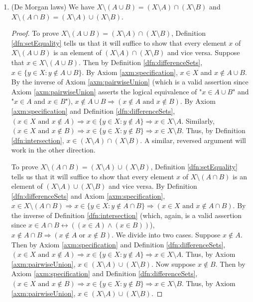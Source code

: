 \documentclass[../main.tex]{subfiles}
\begin{document}
\begin{enumerate}[ref={\thesection.\arabic*}]
\begin{prp}
\begin{enumerate}[label={\textup{(}\alph*\textup{)}}]
\begin{proof}
            \end{proof}
            \item (De Morgan laws) We have $X\setminus(A\cup B)=(X\setminus A)\cap(X\setminus B)$ and $X\setminus(A\cap B)=(X\setminus A)\cup(X\setminus B)$.
            \begin{proof}
                To prove $X\setminus(A\cup B)=(X\setminus A)\cap(X\setminus B)$, Definition \ref{dfn:setEquality} tells us that it will suffice to show that every element $x$ of $X\setminus(A\cup B)$ is an element of $(X\setminus A)\cap(X\setminus B)$ and vice versa. Suppose that $x\in X\setminus(A\cup B)$. Then by Definition \ref{dfn:differenceSets}, $x\in\{y\in X:y\notin A\cup B\}$. By Axiom \ref{axm:specification}, $x\in X$ and $x\notin A\cup B$. By the inverse of Axiom \ref{axm:pairwiseUnion} (which is a valid assertion since Axiom \ref{axm:pairwiseUnion} asserts the logical equivalence of "$x\in A\cup B$" and "$x\in A$ and $x\in B$"), $x\notin A\cup B \Longrightarrow (x\notin A\text{ and }x\notin B)$. By Axiom \ref{axm:specification} and Definition \ref{dfn:differenceSets}, $(x\in X\text{ and }x\notin A) \Longrightarrow x\in\{y\in X:y\notin A\} \Longrightarrow x\in X\setminus A$. Similarly, $(x\in X\text{ and }x\notin B) \Longrightarrow x\in\{y\in X:y\notin B\} \Longrightarrow x\in X\setminus B$. Thus, by Definition \ref{dfn:intersection}, $x\in(X\setminus A)\cap(X\setminus B)$. A similar, reversed argument will work in the other direction.\par
                To prove $X\setminus(A\cap B)=(X\setminus A)\cup(X\setminus B)$, Definition \ref{dfn:setEquality} tells us that it will suffice to show that every element $x$ of $X\setminus(A\cap B)$ is an element of $(X\setminus A)\cup(X\setminus B)$ and vice versa. By Definition \ref{dfn:differenceSets} and Axiom \ref{axm:specification}, $x\in X\setminus(A\cap B) \Longrightarrow x\in\{y\in X:y\notin A\cap B\} \Longrightarrow (x\in X\text{ and }x\notin A\cap B)$. By the inverse of Definition \ref{dfn:intersection} (which, again, is a valid assertion since $x\in A\cap B \leftrightarrow ((x\in A) \wedge (x\in B))$), $x\notin A\cap B \Longrightarrow (x\notin A\text{ or }x\notin B)$. We divide into two cases. Suppose $x\notin A$. Then by Axiom \ref{axm:specification} and Definition \ref{dfn:differenceSets}, $(x\in X\text{ and }x\notin A) \Longrightarrow x\in\{y\in X:y\notin A\} \Longrightarrow x\in X\setminus A$. Thus, by Axiom \ref{axm:pairwiseUnion}, $x\in(X\setminus A)\cup(X\setminus B)$. Now suppose $x\notin B$. Then by Axiom \ref{axm:specification} and Definition \ref{dfn:differenceSets}, $(x\in X\text{ and }x\notin B) \Longrightarrow x\in\{y\in X:y\notin B\} \Longrightarrow x\in X\setminus B$. Thus, by Axiom \ref{axm:pairwiseUnion}, $x\in(X\setminus A)\cup(X\setminus B)$.
            \end{proof}
        \end{enumerate}
    \end{prp}
\end{enumerate}
\end{document}
